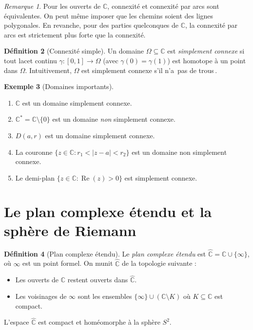 \documentclass[12pt,a4paper,openany]{book}
\theoremstyle{definition}
\newtheorem{definition}{Définition}[chapter]
\newtheorem{exemple}[definition]{Exemple}
\theoremstyle{plain}
\theoremstyle{remark}
\newtheorem{remarque}[definition]{Remarque}
\newcommand{\C}{\mathbb{C}}
\DeclareMathOperator{\re}{Re}
\newcommand{\abs}[1]{\left|#1\right|}
\providecommand{\og}{\guillemotleft\,}
\providecommand{\fg}{\,\guillemotright}
\begin{document}
\begin{remarque}\label{rem:connexite-ouverts}
Pour les ouverts de $\C$, connexité et connexité par arcs sont équivalentes. On peut même imposer que les chemins soient des lignes polygonales. En revanche, pour des parties quelconques de $\C$, la connexité par arcs est strictement plus forte que la connexité.
\end{remarque}

\begin{definition}[Connexité simple]\label{def:simplement-connexe}
Un domaine $\Omega \subseteq \C$ est \emph{simplement connexe} si tout lacet continu $\gamma : [0,1] \to \Omega$ (avec $\gamma(0) = \gamma(1)$) est homotope à un point dans $\Omega$. Intuitivement, $\Omega$ est simplement connexe s'il n'a \og pas de trous\fg{}.
\end{definition}

\begin{exemple}[Domaines importants]\label{ex:domaines}
\begin{enumerate}[label=(\roman*)]
  \item $\C$ est un domaine simplement connexe.
  \item $\C^* = \C \setminus \{0\}$ est un domaine \emph{non} simplement connexe.
  \item $D(a,r)$ est un domaine simplement connexe.
  \item La couronne $\{z \in \C : r_1 < \abs{z-a} < r_2\}$ est un domaine non simplement connexe.
  \item Le demi-plan $\{z \in \C : \re(z) > 0\}$ est simplement connexe.
\end{enumerate}
\end{exemple}

\section{Le plan complexe étendu et la sphère de Riemann}\label{sec:sphere-riemann}

\begin{definition}[Plan complexe étendu]\label{def:plan-etendu}
Le \emph{plan complexe étendu} est $\hat{\C} = \C \cup \{\infty\}$, où $\infty$ est un point formel. On munit $\hat{\C}$ de la topologie suivante :
\begin{itemize}
  \item Les ouverts de $\C$ restent ouverts dans $\hat{\C}$.
  \item Les voisinages de $\infty$ sont les ensembles $\{\infty\} \cup (\C \setminus K)$ où $K \subseteq \C$ est compact.
\end{itemize}
L'espace $\hat{\C}$ est compact et homéomorphe à la sphère $S^2$.
\end{definition}
\end{document}
